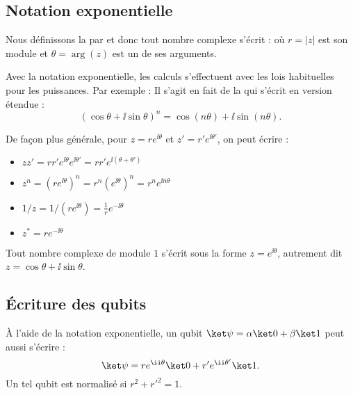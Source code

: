 \documentclass[11pt,class=report,crop=false]{standalone}
\begin{document}
\subsection{Notation exponentielle}

Nous définissons la  par
 et donc tout nombre complexe s'écrit :
o\`u $r = \left| z \right|$ est son module et $\theta = \arg (z)$ est un de ses arguments.

\bigskip

Avec la notation exponentielle, les calculs s'effectuent avec les lois habituelles pour les puissances. 
Par exemple :
Il s'agit en fait de la  qui s'écrit en version étendue :
$$\left( \cos \theta + \ii \sin \theta \right)^n = \cos \left( n \theta \right)
  + \ii  \sin \left( n \theta \right).$$
  
De façon plus générale, pour $z = r e^{\ii  \theta}$
et $z' = r' e^{\ii  \theta'}$, on peut écrire :
\begin{itemize}
	\item $zz' = r r' e^{\ii  \theta} e^{\ii  \theta'} = r r' e^{\ii  (\theta + \theta')}$
	\item $z^n = \left( r e^{\ii  \theta} \right)^n = r^n  \left( e^{\ii  \theta}
	\right)^n = r^n e^{\ii n \theta}$
	\item $1 / z = 1 / \left( r e^{\ii  \theta} \right) = \frac{1}{r} e^{- \ii
		\theta}$
	\item $z^* = r e^{-\ii \theta}$	
\end{itemize}

   
   
Tout nombre complexe de module $1$ s'écrit sous la forme $z=e^{\ii\theta}$,
autrement dit $z = \cos\theta +\ii\sin\theta$.

\subsection{Écriture des qubits}

À l'aide de la notation exponentielle, un qubit $\ket\psi = \alpha \ket0 + \beta \ket1$ peut aussi s'écrire :
$$\ket \psi = r e^{\ii\theta} \ket0 + r'e^{\ii\theta'} \ket1.$$
Un tel qubit est normalisé si $r^2+r'^2=1$.
\end{document}

